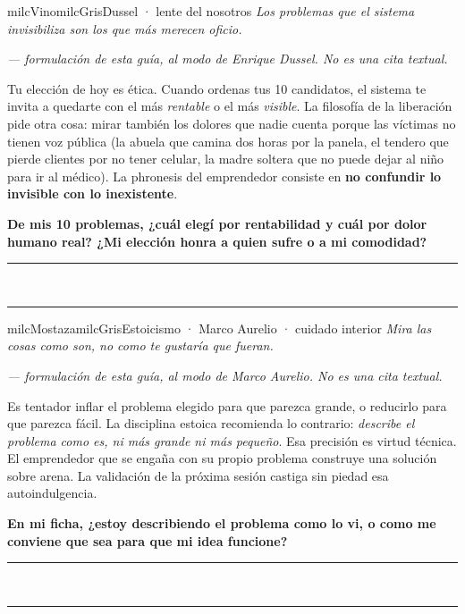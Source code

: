 \documentclass[11pt,letterpaper]{article}
\newcommand{\linead}[1]{\noindent\color{milcLinea}\rule{#1}{0.5pt}\color{milcNegro}}
\begin{document}
\begin{softbox}{milcVino}{milcGris}{Dussel · lente del nosotros}
\textit{Los problemas que el sistema invisibiliza son los que más merecen oficio.}

{\footnotesize\itshape\color{milcNegro!70}--- formulación de esta guía, al modo de Enrique Dussel. No es una cita textual.}

Tu elección de hoy es ética. Cuando ordenas tus 10 candidatos, el sistema te invita a quedarte con el más \emph{rentable} o el más \emph{visible}. La filosofía de la liberación pide otra cosa: mirar también los dolores que nadie cuenta porque las víctimas no tienen voz pública (la abuela que camina dos horas por la panela, el tendero que pierde clientes por no tener celular, la madre soltera que no puede dejar al niño para ir al médico). La phronesis del emprendedor consiste en \textbf{no confundir lo invisible con lo inexistente}.

\textbf{De mis 10 problemas, ¿cuál elegí por rentabilidad y cuál por dolor humano real? ¿Mi elección honra a quien sufre o a mi comodidad?}
\end{softbox}
\linead{\linewidth}\\[1mm]
\linead{\linewidth}

\begin{softbox}{milcMostaza}{milcGris}{Estoicismo · Marco Aurelio · cuidado interior}
\textit{Mira las cosas como son, no como te gustaría que fueran.}

{\footnotesize\itshape\color{milcNegro!70}--- formulación de esta guía, al modo de Marco Aurelio. No es una cita textual.}

Es tentador inflar el problema elegido para que parezca grande, o reducirlo para que parezca fácil. La disciplina estoica recomienda lo contrario: \emph{describe el problema como es, ni más grande ni más pequeño}. Esa precisión es virtud técnica. El emprendedor que se engaña con su propio problema construye una solución sobre arena. La validación de la próxima sesión castiga sin piedad esa autoindulgencia.

\textbf{En mi ficha, ¿estoy describiendo el problema como lo vi, o como me conviene que sea para que mi idea funcione?}
\end{softbox}
\linead{\linewidth}\\[1mm]
\linead{\linewidth}
\end{document}
